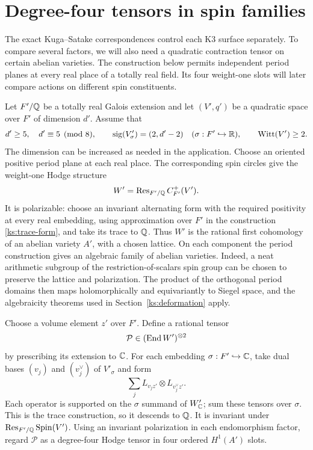 \section{Degree-four tensors in spin families}
\label{sec:auxiliary}

The exact Kuga--Satake correspondences control each K3
surface separately.  To compare several factors, we will
also need a quadratic contraction tensor on certain
abelian varieties.  The construction below permits
independent period planes at every real place of a
totally real field.  Its four weight-one slots will
later compare actions on different spin constituents.

Let $F'/\mathbb Q$ be a totally real Galois extension and let
$(V',q')$ be a quadratic space over $F'$ of dimension $d'$.
Assume that
\begin{equation}
 \label{aux:quadratic-assumptions}
 d'\ge5,\quad d'\equiv5\pmod8,\qquad
 \operatorname{sig}(V'_\sigma)=(2,d'-2)
       \quad(\sigma:F'\hookrightarrow\mathbb R),\qquad
 \operatorname{Witt}(V')\ge2.
\end{equation}
The dimension can be increased as needed in the
application.  Choose an
oriented positive period plane at each real place.  The
corresponding spin circles give the weight-one Hodge
structure
\begin{equation}
 \label{aux:weight-one}
 W'=\operatorname{Res}_{F'/\mathbb Q}C^+_{F'}(V').
\end{equation}
It is polarizable: choose an invariant alternating form
with the required positivity at every real embedding,
using approximation over $F'$ in the construction
\eqref{ks:trace-form}, and take its trace to $\mathbb Q$.
Thus $W'$ is the rational first cohomology of an abelian
variety $A'$, with a chosen lattice.  On each component
the period construction gives an algebraic family of
abelian varieties.  Indeed, a neat arithmetic subgroup
of the restriction-of-scalars spin group can be chosen
to preserve the lattice and polarization.  The product
of the orthogonal period domains then maps
holomorphically and equivariantly to Siegel space, and
the algebraicity theorems used in
Section~\ref{ks:deformation} apply.

Choose a volume element $z'$ over $F'$.  Define a
rational tensor
\begin{equation}
 \label{aux:P}
 \mathcal P\in(\operatorname{End} W')^{\otimes2}
\end{equation}
by prescribing its extension to $\mathbb C$.  For each embedding
$\sigma:F'\hookrightarrow\mathbb C$, take dual bases
$(v_j)$ and $(v_j^\vee)$ of $V'_\sigma$ and form
\[
 \sum_jL_{v_jz'}\otimes L_{v_j^\vee z'}.
\]
Each operator is supported on the $\sigma$ summand of
$W'_\mathbb C$; sum these tensors over $\sigma$.  This is the
trace construction, so it descends to $\mathbb Q$.  It is
invariant under $\operatorname{Res}_{F'/\mathbb Q}\operatorname{Spin}(V')$.
Using an invariant polarization in each endomorphism
factor, regard $\mathcal P$ as a degree-four Hodge
tensor in four ordered $H^1(A')$ slots.

